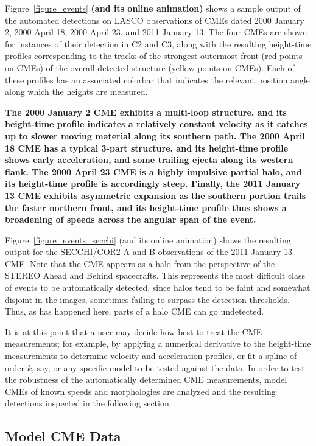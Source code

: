 \documentclass[preprint2]{aastex}
\begin{document}
Figure~\ref{figure_events} {\bf (and its online animation)} shows a sample output of the automated detections on LASCO observations of CMEs dated 2000 January 2, 2000 April 18, 2000 April 23, and 2011 January 13. The four CMEs are shown for instances of their detection in C2 and C3, along with the resulting height-time profiles corresponding to the tracks of the strongest outermost front (red points on CMEs) of the overall detected structure (yellow points on CMEs). Each of these profiles has an associated colorbar that indicates the relevant position angle along which the heights are measured. {\bf The 2000 January 2 CME exhibits a multi-loop structure, and its height-time profile indicates a relatively constant velocity as it catches up to slower moving material along its southern path. The 2000 April 18 CME has a typical 3-part structure, and its height-time profile shows early acceleration, and some trailing ejecta along its western flank. The 2000 April 23 CME is a highly impulsive partial halo, and its height-time profile is accordingly steep. Finally, the 2011 January 13 CME exhibits asymmetric expansion as the southern portion trails the faster northern front, and its height-time profile thus shows a broadening of speeds across the angular span of the event.

Figure~\ref{figure_events_secchi} (and its online animation) shows the resulting output for the SECCHI/COR2-A and B observations of the 2011 January 13 CME. Note that the CME appears as a halo from the perspective of the STEREO Ahead and Behind spacecrafts. This represents the most difficult class of events to be automatically detected, since halos tend to be faint and somewhat disjoint in the images, sometimes failing to surpass the detection thresholds. Thus, as has happened here, parts of a halo CME can go undetected.}

It is at this point that a user may decide how best to treat the CME measurements; for example, by applying a numerical derivative to the height-time measurements to determine velocity and acceleration profiles, or fit a spline of order $k$, say, or any specific model to be tested against the data. In order to test the robustness of the automatically determined CME measurements, model CMEs of known speeds and morphologies are analyzed and the resulting detections inspected in the following section.


\subsection{Model CME Data}
\end{document}
